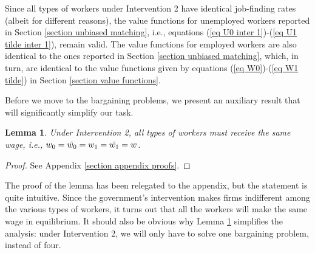 \documentclass[12pt]{article} %
\newtheorem{lemma}[theorem]{Lemma}
\theoremstyle{definition}
\begin{document}
Since all types of workers under Intervention 2 have identical job-finding rates (albeit for different reasons), the value functions for unemployed workers reported in Section \ref{section unbiased matching}, i.e., equations (\ref{eq U0 inter 1})-(\ref{eq U1 tilde inter 1}), remain valid. 
The value functions for employed workers are also identical to the ones reported in Section \ref{section unbiased matching}, which, in turn, are identical to the value functions given by equations (\ref{eq W0})-(\ref{eq W1 tilde}) in Section \ref{section value functions}. 

Before we move to the bargaining problems, we present an auxiliary result that will significantly simplify our task.

\begin{lemma}\label{lemma all ws the same}
Under Intervention 2, all types of workers must receive the same wage, i.e., $w_0=\Tilde{w_0}=w_1=\Tilde{w_1}=w$.     \end{lemma}
\begin{proof}
See Appendix \ref{section appendix proofs}.
\end{proof}

The proof of the lemma has been relegated to the appendix, but the statement is quite intuitive. Since the government's intervention makes firms indifferent among the various types of workers, it turns out that all the workers will make the same wage in equilibrium. It should also be obvious why Lemma \ref{lemma all ws the same} simplifies the analysis: under Intervention 2, we will only have to solve one bargaining problem, instead of four. 
\end{document}
